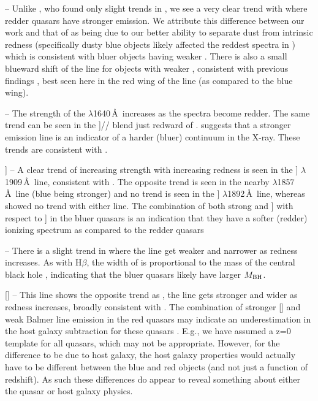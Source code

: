  -- Unlike \citet{Richards:2003}, who found only slight trends in \civ, we see a very clear trend with  where redder quasars have stronger emission.  We attribute this difference between our work and that of \citet{Richards:2003} as being due to our better ability to separate dust from intrinsic redness (specifically dusty blue objects likely affected the reddest spectra in \citet{Richards:2003}) which is consistent with bluer objects having weaker .  There is also a small blueward shift of the line for objects with weaker , consistent with previous findings \citep[e.g. ][]{Sulentic:2007,Richards:2011,Gaskell:2013}, best seen here in the red wing of the line (as compared to the blue wing).

 -- The strength of the  $\lambda$1640\,\AA\ increases as the spectra become redder.  The same trend can be seen in the ]// blend just redward of . \citet{Leighly:2004a} suggests that a stronger  emission line is an indicator of a harder (bluer) continuum in the X-ray. These trends are consistent with \citet{Richards:2003}.

] -- A clear trend of increasing strength with increasing redness is seen in the ] $\lambda$1909\,\AA\ line, consistent with \citet{Richards:2003}. The opposite trend is seen in the nearby  $\lambda$1857\,\AA\ line (blue being stronger) and no trend is seen in the ] $\lambda$1892\,\AA\ line, whereas \citet{Richards:2003} showed no trend with either line.  The combination of both strong  and ] with respect to ] in the bluer quasars is an indication that they have a softer (redder) ionizing spectrum as compared to the redder quasars \citep[Appendix A3 of][]{Casebeer:2006,Grupe:2010}

 -- There is a slight trend in  where the line get weaker and narrower as redness increases. As with H$\beta$, the width of  is proportional to the mass of the central black hole \citet[e.g.,][]{Peterson:2011}, indicating that the bluer quasars likely have larger $M_{\rm BH}$.

[] -- This line shows the opposite trend as , the line gets stronger and wider as redness increases, broadly consistent with \citet{Richards:2003}. %
The combination of stronger [] and weak Balmer line emission in the red quasars may indicate an underestimation in the host galaxy subtraction for these quasars \citep[e.g.,][]{Ho:2005}. E.g., we have assumed a z=0 template for all quasars, which may not be appropriate.  However, for the difference to be due to host galaxy, the host galaxy properties would actually have to be different between the blue and red objects (and not just a function of redshift). As such these differences do appear to reveal something about either the quasar or host galaxy physics.

